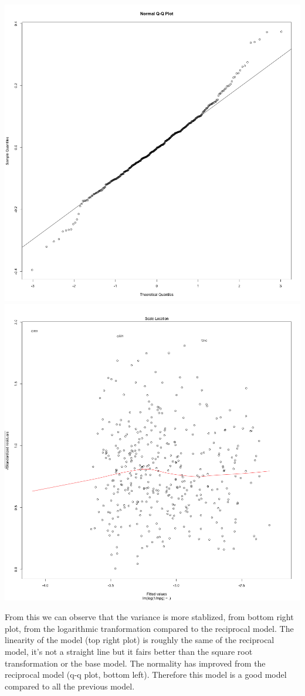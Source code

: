 \documentclass[11pt]{article} %
\begin{document}
\begin{center}
\includegraphics[scale=0.13]{5_QQplot}
\includegraphics[scale=0.13]{5_Variance}
\end{center}
From this we can observe that the variance is more stablized, from bottom right plot, from the logarithmic tranformation compared to the reciprocal model. The linearity of the model (top right plot) is roughly the same of the reciprocal model, it's not a straight line but it fairs better than the square root transformation or the base model. The normality has improved from the reciprocal model (q-q plot, bottom left). Therefore this model is a good model compared to all the previous model.
\end{document}
